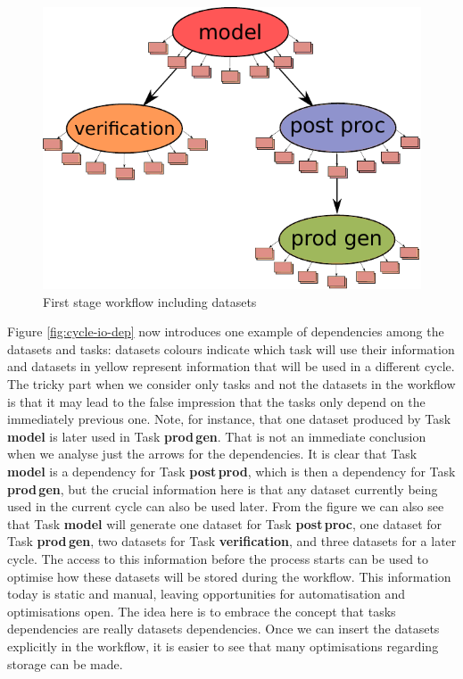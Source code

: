 \documentclass[a4paper]{article}
\begin{document}
{{{{\begin{figure}[H]
  \centering
  \includegraphics[width=0.6\columnwidth]{cycle-io}
  \caption{First stage workflow including datasets}
  \label{fig:cycle-io}
\end{figure}

Figure \ref{fig:cycle-io-dep} now introduces one example of dependencies among the datasets and tasks: datasets colours indicate which task will use their information and datasets in yellow represent information that will be used in a different cycle. The tricky part when we consider only tasks and not the datasets in the workflow is that it may lead to the false impression that the tasks only depend on the immediately previous one. Note, for instance, that one dataset produced by Task \textbf{model} is later used in Task \textbf{prod\,gen}. That is not an immediate conclusion when we analyse just the arrows for the dependencies. It is clear that Task \textbf{model} is a dependency for Task \textbf{post\,prod}, which is then a dependency for Task \textbf{prod\,gen}, but the crucial information here is that any dataset currently being used in the current cycle can also be used later. From the figure we can also see that Task \textbf{model} will generate one dataset for Task \textbf{post\,proc}, one dataset for Task \textbf{prod\,gen}, two datasets for Task \textbf{verification}, and three datasets for a later cycle.
The access to this information before the process starts can be used to optimise how these datasets will be stored during the workflow. This information today is static and manual, leaving opportunities for automatisation and optimisations open.
The idea here is to embrace the concept that tasks dependencies are really datasets dependencies. Once we can insert the datasets explicitly in the workflow, it is easier to see that many optimisations regarding storage can be made.

}}}}
\end{document}
